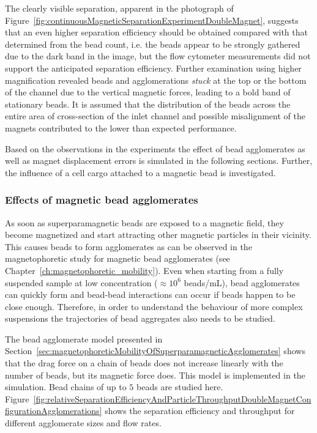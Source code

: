 The clearly visible separation, apparent in the photograph of Figure~\ref{fig:continuousMagneticSeparationExperimentDoubleMagnet}, suggests that an even higher separation efficiency should be obtained compared with that determined from the bead count, i.e. the beads appear to be strongly gathered due to the dark band in the image, but the flow cytometer measurements did not support the anticipated separation efficiency. Further examination using higher magnification revealed beads and agglomerations \textit{stuck} at the top or the bottom of the channel due to the vertical magnetic forces, leading to a bold band of stationary beads. It is assumed that the distribution of the beads across the entire area of cross-section of the inlet channel and possible misalignment of the magnets contributed to the lower than expected performance.

Based on the observations in the experiments the effect of bead agglomerates as well as magnet displacement errors is simulated in the following sections. Further, the influence of a cell cargo attached to a magnetic bead is investigated.

\subsubsection{Effects of magnetic bead agglomerates}
\label{subsec:particleTrajectoriesOfAgglomerates}
As soon as superparamagnetic beads are exposed to a magnetic field, they become magnetized and start attracting other magnetic particles in their vicinity. This causes beads to form agglomerates as can be observed in the magnetophoretic study for magnetic bead agglomerates (see Chapter~\ref{ch:magnetophoretic_mobility}). Even when starting from a fully suspended sample at low concentration ($\approx10^{6}$ beads/mL), bead agglomerates can quickly form and bead-bead interactions can occur if beads happen to be close enough. Therefore, in order to understand the behaviour of more complex suspensions the trajectories of bead aggregates also needs to be studied. 
 
The bead agglomerate model presented in Section~\ref{sec:magnetophoreticMobilityOfSuperparamagneticAgglomerates} shows that the drag force on a chain of beads does not increase linearly with the number of beads, but its magnetic force does. This model is implemented in the simulation. Bead chains of up to $5$ beads are studied here. Figure~\ref{fig:relativeSeparationEfficiencyAndParticleThroughputDoubleMagnetConfigurationAgglomerations} shows the separation efficiency and throughput for different agglomerate sizes and flow rates.

